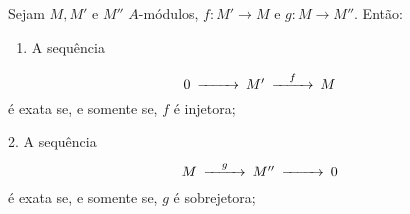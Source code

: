 \begin{proposition}
	\label{loc:def_8_:_sequências_exatas.propriedades_de_sequências_exatas}
	Sejam $M, M'$ e $M''$ $A$-módulos, $f:M'\to M$ e $g:M\to M''$. Então:

	\begin{enumerate}
		\item A sequência
	\end{enumerate}
	\begin{equation*}
		\begin{CD}
			0 @>>> M' @>{f}>> M
		\end{CD}
	\end{equation*}
	é exata se, e somente se, $f$ é injetora;

	2. A sequência
	\begin{equation*}
		\begin{CD}
			M @>{g}>>M''@>>>0
		\end{CD}
	\end{equation*}
	é exata se, e somente se, $g$ é sobrejetora;


\end{proposition}
